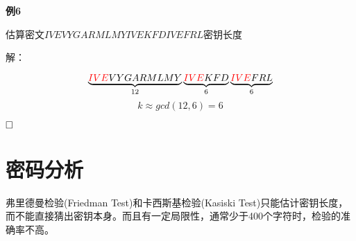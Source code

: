 \documentclass{article}
\begin{document}
\textbf{例6}

估算密文$I V E V Y G A R M L M Y I V E K F D I V E F R L$密钥长度

解：

$$ \underbrace{{\color{red}IVE}V Y G A R M L M Y }_{12}  \underbrace{{\color{red}IVE} K F D}_{6} \underbrace{{\color{red}IVE} FRL}_{6}$$
$$k \approx gcd(12,6) = 6$$


$\hfill\square$ 


\section{密码分析}
弗里德曼检验(Friedman Test)和卡西斯基检验(Kasiski Test)只能估计密钥长度，而不能直接猜出密钥本身。而且有一定局限性，通常少于400个字符时，检验的准确率不高。
\end{document}
